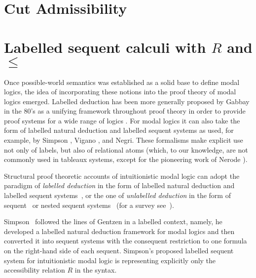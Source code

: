 \documentclass[a4paper]{article}
\theoremstyle{plain}
\theoremstyle{definition}
\newcommand{\B}{\mathcal{R}}
\newcommand*{\fm}[1]{{\color{notgreen}{#1}}}
\newcommand*{\lb}[1]{{\color{blue}{#1}}}
\newcommand*{\labels}[2]{\lb{#1}\mathord{:}\fm{#2}}
\newcommand{\SEQ}{\Longrightarrow}
\newcommand*{\rel}{R}
\begin{document}
\section{Cut Admissibility}\label{sec:cut-elim}



\section{Labelled sequent calculi with $\rel$ and $\le$}


Once possible-world semantics was established as a solid base to define modal logics, the idea of incorporating these notions into the proof theory of modal logics emerged.  Labelled deduction has been more generally proposed by Gabbay in the 80's as a unifying framework throughout proof theory in order to provide proof systems for a wide range of logics \cite{Gabbay}. For modal logics it can also take the form of labelled natural deduction and labelled sequent systems as used, for example, by Simpson \cite{Simpson}, Vigano \cite{Vigano}, and Negri\cite{Negri}. These formalisms make explicit use not only of labels, but also of relational atoms (which, to our knowledge, are not commonly used in tableaux systems, except for the pioneering work of Nerode \cite{Nerode}).

Structural proof theoretic accounts of intuitionistic modal logic can adopt the paradigm of \emph{labelled deduction} in the form of labelled natural deduction and labelled sequent systems~\cite{Simpson}, or the one of \emph{unlabelled deduction} in the form of sequent~\cite{Bierman} or nested sequent systems~\cite{Strassburger} (for a survey see~\cite[Chap.~3]{Marin}).

Simpson~\cite{Simpson} followed the lines of Gentzen in a labelled context, namely, he developed a labelled natural deduction framework for modal logics and then converted it into sequent systems with the consequent restriction to one formula on the right-hand side of each sequent. Simpson's proposed labelled sequent system for intuitionistic modal logic is representing explicitly only the accessibility relation $\rel$ in the syntax.
%
\end{document}
